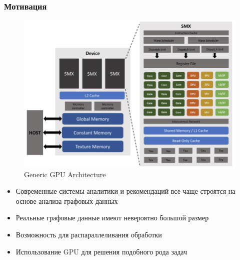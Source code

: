 \documentclass[xcolor=table,english]{beamer}
\begin{document}
\begin{frame}[fragile] \frametitle{Мотивация} 
    \begin{minipage}[m]{0.45\linewidth}
        \begin{figure}
            \centering
            \includegraphics[width=\textwidth]{pictures/gpu_architecture.png}
            \caption{Generic GPU Architecture}
            \label{fig:architecture}
        \end{figure}
    \end{minipage}\hfill
    \begin{minipage}[m]{0.55\linewidth}
        \begin{itemize}
            \item Современные системы аналитики и рекомендаций все чаще строятся на основе     анализа графовых данных
            \item Реальные графовые данные имеют невероятно большой размер
            \item Возможность для распараллеливания обработки
            \item Использование GPU для решения подобного рода задач
        \end{itemize}
    \end{minipage}
\end{frame}
\end{document}

